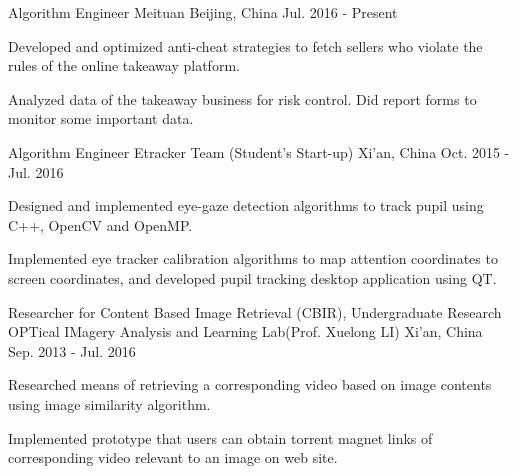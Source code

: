 

\begin{cventries}

  \cventry
    {Algorithm Engineer} %
    {Meituan} %
    {Beijing, China} %
    {Jul. 2016 - Present} %
    {
      \begin{cvitems} %
        \item {Developed and optimized anti-cheat strategies to fetch sellers who violate the rules of the online takeaway platform.}
        \item {Analyzed data of the takeaway business for risk control. Did report forms to monitor some important data.}
      \end{cvitems}
    }

  \cventry
    {Algorithm Engineer} %
    {Etracker Team (Student's Start-up)} %
    {Xi'an, China} %
    {Oct. 2015 - Jul. 2016} %
    {
      \begin{cvitems} %
        \item {Designed and implemented eye-gaze detection algorithms to track pupil using C++, OpenCV and OpenMP.}
        \item {Implemented eye tracker calibration algorithms to map attention coordinates to screen coordinates, and developed pupil tracking desktop application using QT.}
      \end{cvitems}
    }

  \cventry
    {Researcher for Content Based Image Retrieval (CBIR), Undergraduate Research} %
    {OPTical IMagery Analysis and Learning Lab(Prof. Xuelong LI)} %
    {Xi'an, China} %
    {Sep. 2013 - Jul. 2016} %
    {
      \begin{cvitems} %
        \item {Researched means of retrieving a corresponding video based on image contents using image similarity algorithm.}
        \item {Implemented prototype that users can obtain torrent magnet links of corresponding video relevant to an image on web site.}
      \end{cvitems}
    }

\end{cventries}
